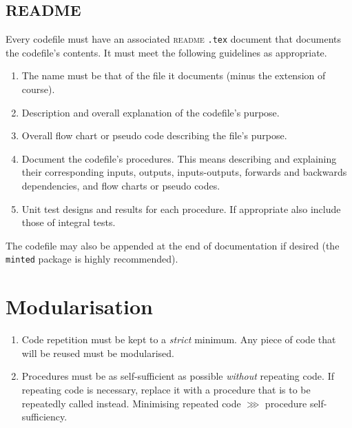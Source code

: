 		\subsection{README}\label{c:best_practices:s:documentation:ss:readme}
			Every codefile must have an associated \textsc{readme} \texttt{.tex} document that documents the codefile's contents. It must meet the following guidelines as appropriate.
			\begin{enumerate}
				\item The name must be that of the file it documents (minus the extension of course).
				\item Description and overall explanation of the codefile's purpose.
				\item Overall flow chart or pseudo code describing the file's purpose.
				\item Document the codefile's procedures. This means describing and explaining their corresponding inputs, outputs, inputs-outputs, forwards and backwards dependencies, and flow charts or pseudo codes.
				\item Unit test designs and results for each procedure. If appropriate also include those of integral tests.
			\end{enumerate}
			The codefile may also be appended at the end of documentation if desired (the \texttt{minted} package is highly recommended).
	\section{Modularisation}\label{c:best_practices:s:modularisation}
		\begin{enumerate}
			\item Code repetition must be kept to a \emph{strict} minimum. Any piece of code that will be reused must be modularised.
			\item Procedures must be as self-sufficient as possible \emph{without} repeating code. If repeating code is necessary, replace it with a procedure that is to be repeatedly called instead. Minimising repeated code $\ggg$ procedure self-sufficiency.
		\end{enumerate}
